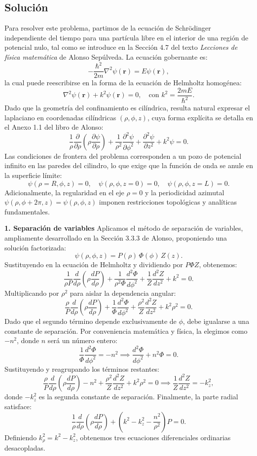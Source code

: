 \documentclass[a4paper]{article}
\begin{document}
\subsection{Solución}
Para resolver este problema, partimos de la ecuación de Schrödinger independiente del tiempo para una partícula libre en el interior de una región de potencial nulo, tal como se introduce en la Sección 4.7 del texto \textit{Lecciones de física matemática} de Alonso Sepúlveda. La ecuación gobernante es:
$$-\frac{\hbar^2}{2m}\nabla^2\psi(\mathbf{r}) = E\psi(\mathbf{r}),$$
la cual puede reescribirse en la forma de la ecuación de Helmholtz homogénea:
$$\nabla^2\psi(\mathbf{r}) + k^2\psi(\mathbf{r}) = 0, \quad \text{con } k^2 = \frac{2mE}{\hbar^2}.$$
Dado que la geometría del confinamiento es cilíndrica, resulta natural expresar el laplaciano en coordenadas cilíndricas $(\rho, \phi, z)$, cuya forma explícita se detalla en el Anexo 1.1 del libro de Alonso:
$$\frac{1}{\rho}\frac{\partial}{\partial\rho}\left(\rho\frac{\partial\psi}{\partial\rho}\right) + \frac{1}{\rho^2}\frac{\partial^2\psi}{\partial\phi^2} + \frac{\partial^2\psi}{\partial z^2} + k^2\psi = 0.$$
Las condiciones de frontera del problema corresponden a un pozo de potencial infinito en las paredes del cilindro, lo que exige que la función de onda se anule en la superficie límite:
$$\psi(\rho=R, \phi, z) = 0, \quad \psi(\rho, \phi, z=0) = 0, \quad \psi(\rho, \phi, z=L) = 0.$$
Adicionalmente, la regularidad en el eje $\rho=0$ y la periodicidad azimutal $\psi(\rho, \phi+2\pi, z) = \psi(\rho, \phi, z)$ imponen restricciones topológicas y analíticas fundamentales.

\textbf{1. Separación de variables}
Aplicamos el método de separación de variables, ampliamente desarrollado en la Sección 3.3.3 de Alonso, proponiendo una solución factorizada:
$$\psi(\rho, \phi, z) = P(\rho)\,\Phi(\phi)\,Z(z).$$
Sustituyendo en la ecuación de Helmholtz y dividiendo por $P\Phi Z$, obtenemos:
$$\frac{1}{\rho P}\frac{d}{d\rho}\left(\rho\frac{dP}{d\rho}\right) + \frac{1}{\rho^2\Phi}\frac{d^2\Phi}{d\phi^2} + \frac{1}{Z}\frac{d^2Z}{dz^2} + k^2 = 0.$$
Multiplicando por $\rho^2$ para aislar la dependencia angular:
$$\frac{\rho}{P}\frac{d}{d\rho}\left(\rho\frac{dP}{d\rho}\right) + \frac{1}{\Phi}\frac{d^2\Phi}{d\phi^2} + \frac{\rho^2}{Z}\frac{d^2Z}{dz^2} + k^2\rho^2 = 0.$$
Dado que el segundo término depende exclusivamente de $\phi$, debe igualarse a una constante de separación. Por conveniencia matemática y física, la elegimos como $-n^2$, donde $n$ será un número entero:
$$\frac{1}{\Phi}\frac{d^2\Phi}{d\phi^2} = -n^2 \implies \frac{d^2\Phi}{d\phi^2} + n^2\Phi = 0.$$
Sustituyendo y reagrupando los términos restantes:
$$\frac{\rho}{P}\frac{d}{d\rho}\left(\rho\frac{dP}{d\rho}\right) - n^2 + \frac{\rho^2}{Z}\frac{d^2Z}{dz^2} + k^2\rho^2 = 0 \implies \frac{1}{Z}\frac{d^2Z}{dz^2} = -k_z^2,$$
donde $-k_z^2$ es la segunda constante de separación. Finalmente, la parte radial satisface:
$$\frac{1}{\rho}\frac{d}{d\rho}\left(\rho\frac{dP}{d\rho}\right) + \left(k^2 - k_z^2 - \frac{n^2}{\rho^2}\right)P = 0.$$
Definiendo $k_\rho^2 = k^2 - k_z^2$, obtenemos tres ecuaciones diferenciales ordinarias desacopladas.
\end{document}
